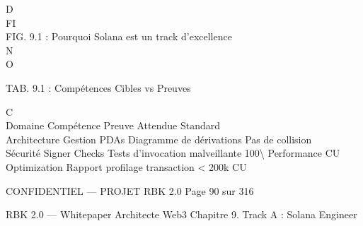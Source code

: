 \documentclass[12pt,landscape,a4paper]{article}
\newenvironment{confidential}
{\begin{tcolorbox}[
    colback=rbkred!5!white,
    colframe=rbkred!75!black,
    title=CONFIDENTIEL,
    fonttitle=\bfseries\color{white},
    coltitle=rbkred!75!black,
    breakable,
    enhanced,
    frame hidden,
    borderline west={2pt}{0pt}{rbkred!75!black}
]}
{\end{tcolorbox}}
\begin{document}
\vspace{0.5em}
\vspace{0.5em}
D\\
FI\\
FIG. 9.1 : Pourquoi Solana est un track d’excellence\\
N\\
O\\
\begin{center}\begin{tabular}TAB. 9.1 : Compétences Cibles vs Preuves\end{tabular}\end{center}
C\\
\vspace{0.5em}
\vspace{0.5em}
Domaine      Compétence     Preuve Attendue                 Standard\\
Architecture Gestion PDAs   Diagramme de dérivations        Pas de collision\\
Sécurité     Signer Checks  Tests d’invocation malveillante 100\textbackslash{}%
Performance CU Optimization Rapport profilage transaction \textless{} 200k CU\\
\vspace{0.5em}
\vspace{0.5em}
\vspace{0.5em}
\vspace{0.5em}
\begin{confidential}CONFIDENTIEL — PROJET RBK 2.0                                   Page 90 sur 316\end{confidential}
RBK 2.0 — Whitepaper Architecte Web3                                                                 Chapitre 9. Track A : Solana Engineer\\
\vspace{0.5em}
\vspace{0.5em}
\vspace{0.5em}
\end{document}
